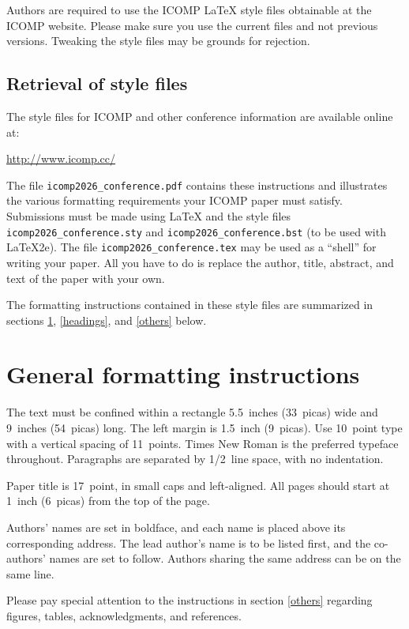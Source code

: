 \documentclass{article} %
\begin{document}
Authors are required to use the ICOMP \LaTeX{} style files obtainable at the
ICOMP website. Please make sure you use the current files and
not previous versions. Tweaking the style files may be grounds for rejection.

\subsection{Retrieval of style files}

The style files for ICOMP and other conference information are available online at:
\begin{center}
   \url{http://www.icomp.cc/}
\end{center}
The file \verb+icomp2026_conference.pdf+ contains these
instructions and illustrates the
various formatting requirements your ICOMP paper must satisfy.
Submissions must be made using \LaTeX{} and the style files
\verb+icomp2026_conference.sty+ and \verb+icomp2026_conference.bst+ (to be used with \LaTeX{}2e). The file
\verb+icomp2026_conference.tex+ may be used as a ``shell'' for writing your paper. All you
have to do is replace the author, title, abstract, and text of the paper with
your own.

The formatting instructions contained in these style files are summarized in
sections \ref{gen_inst}, \ref{headings}, and \ref{others} below.

\section{General formatting instructions}
\label{gen_inst}

The text must be confined within a rectangle 5.5~inches (33~picas) wide and
9~inches (54~picas) long. The left margin is 1.5~inch (9~picas).
Use 10~point type with a vertical spacing of 11~points. Times New Roman is the
preferred typeface throughout. Paragraphs are separated by 1/2~line space,
with no indentation.

Paper title is 17~point, in small caps and left-aligned.
All pages should start at 1~inch (6~picas) from the top of the page.

Authors' names are
set in boldface, and each name is placed above its corresponding
address. The lead author's name is to be listed first, and
the co-authors' names are set to follow. Authors sharing the
same address can be on the same line.

Please pay special attention to the instructions in section \ref{others}
regarding figures, tables, acknowledgments, and references.
\end{document}
